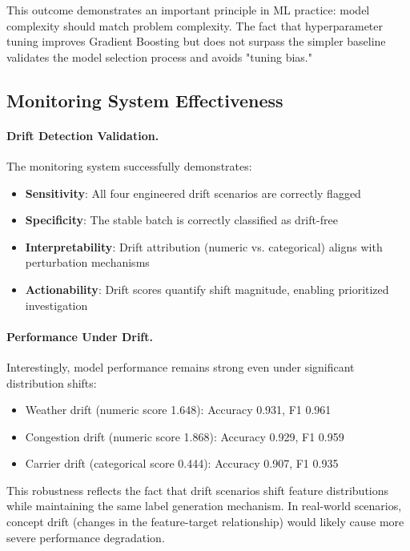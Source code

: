 \documentclass[11pt,a4paper]{article}
\begin{document}
This outcome demonstrates an important principle in ML practice: model complexity should match problem complexity. The fact that hyperparameter tuning improves Gradient Boosting but does not surpass the simpler baseline validates the model selection process and avoids "tuning bias."

\subsection{Monitoring System Effectiveness}

\paragraph{Drift Detection Validation.}
The monitoring system successfully demonstrates:
\begin{itemize}
    \item \textbf{Sensitivity}: All four engineered drift scenarios are correctly flagged
    \item \textbf{Specificity}: The stable batch is correctly classified as drift-free
    \item \textbf{Interpretability}: Drift attribution (numeric vs. categorical) aligns with perturbation mechanisms
    \item \textbf{Actionability}: Drift scores quantify shift magnitude, enabling prioritized investigation
\end{itemize}

\paragraph{Performance Under Drift.}
Interestingly, model performance remains strong even under significant distribution shifts:
\begin{itemize}
    \item Weather drift (numeric score 1.648): Accuracy 0.931, F1 0.961
    \item Congestion drift (numeric score 1.868): Accuracy 0.929, F1 0.959
    \item Carrier drift (categorical score 0.444): Accuracy 0.907, F1 0.935
\end{itemize}

This robustness reflects the fact that drift scenarios shift feature distributions while maintaining the same label generation mechanism. In real-world scenarios, concept drift (changes in the feature-target relationship) would likely cause more severe performance degradation.
\end{document}
